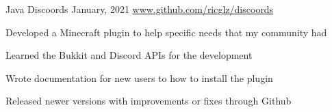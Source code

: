 \begin{cventries}

  \cventry
    {Java}
    {Discoords}
    {January, 2021}
    {\url{www.github.com/ricglz/discoords}}
    {
      \begin{cvitems}
        \item {Developed a Minecraft plugin to help specific needs that my community had}
        \item {Learned the Bukkit and Discord APIs for the development}
        \item {Wrote documentation for new users to how to install the plugin}
        \item {Released newer versions with improvements or fixes through Github}
      \end{cvitems}
    }

\end{cventries}
